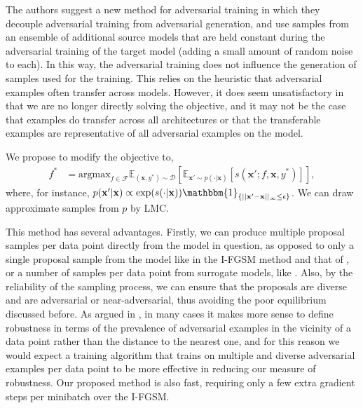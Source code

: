 The authors suggest a new method for adversarial training in which they decouple adversarial training from adversarial generation, and use samples from an ensemble of additional source models that are held constant during the adversarial training of the target model (adding a small amount of random noise to each). In this way, the adversarial training does not influence the generation of samples used for the training. This relies on the heuristic that adversarial examples often transfer across models. However, it does seem unsatisfactory in that we are no longer directly solving the objective, and it may not be the case that examples do transfer across all architectures or that the transferable examples are representative of all adversarial examples on the model.

We propose to modify the objective to,
\begin{align*}
	f^* &= \text{argmax}_{f\in\mathcal{F}}\mathbb{E}_{(\mathbf{x},y^*)\sim\mathcal{D}}\left[\mathbb{E}_{\mathbf{x}'\sim p(\cdot|\mathbf{x})}\left[s(\mathbf{x}';f,\mathbf{x},y^*)\right]\right],
\end{align*}
where, for instance, $p(\mathbf{x}'|\mathbf{x})\propto\exp(s(\cdot|\mathbf{x}))\mathbbm{1}_{\{||\mathbf{x}'-\mathbf{x}||_\infty\le\epsilon\}}$. We can draw approximate samples from $p$ by LMC.

This method has several advantages. Firstly, we can produce multiple proposal samples per data point directly from the model in question, as opposed to only a single proposal sample from the model like in the I-FGSM method and that of \citet{kolter2017provable}, or a number of samples per data point from surrogate models, like \citet{tramer2017ensemble}. Also, by the reliability of the sampling process, we can ensure that the proposals are diverse and are  adversarial or near-adversarial, thus avoiding the poor equilibrium discussed before. As argued in \citet{webb2018statistical}, in many cases it makes more sense to define robustness in terms of the prevalence of adversarial examples in the vicinity of a data point rather than the distance to the nearest one, and for this reason we would expect a training algorithm that trains on multiple and diverse adversarial examples per data point to be more effective in reducing our measure of robustness. Our proposed method is also fast, requiring only a few extra gradient steps per minibatch over the I-FGSM.


